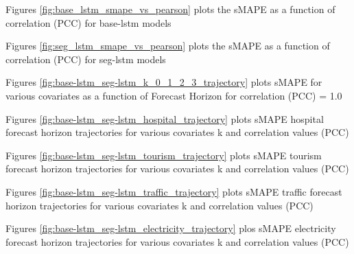 \documentclass{article}
\begin{document}
Figures \ref{fig:base_lstm_smape_vs_pearson} plots the sMAPE as a function of correlation (PCC) for base-lstm models

Figures \ref{fig:seg_lstm_smape_vs_pearson} plots the sMAPE as a function of correlation (PCC) for seg-lstm models

Figures \ref{fig:base-lstm_seg-lstm_k_0_1_2_3_trajectory} plots sMAPE for various covariates as a function of Forecast Horizon for correlation (PCC) = 1.0

Figures \ref{fig:base-lstm_seg-lstm_hospital_trajectory} plots sMAPE hospital forecast horizon trajectories for various covariates k and correlation values (PCC)

Figures \ref{fig:base-lstm_seg-lstm_tourism_trajectory} plots sMAPE tourism forecast horizon trajectories for various covariates k and correlation values (PCC)

Figures \ref{fig:base-lstm_seg-lstm_traffic_trajectory} plots sMAPE traffic forecast horizon trajectories for various covariates k and correlation values (PCC)

Figures \ref{fig:base-lstm_seg-lstm_electricity_trajectory} plos sMAPE electricity forecast horizon trajectories for various covariates k and correlation values (PCC)
\end{document}
